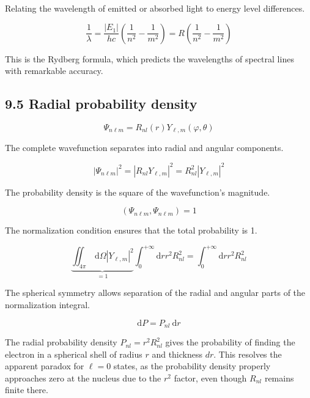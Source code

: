 \documentclass[italian]{HKNdocument}
\begin{document}
Relating the wavelength of emitted or absorbed light to energy level differences.

\begin{equation*}
\frac{1}{\lambda}=\frac{\left|E_{1}\right|}{h c}\left(\frac{1}{n^{2}}-\frac{1}{m^{2}}\right)=R\left(\frac{1}{n^{2}}-\frac{1}{m^{2}}\right) \tag{9.94}
\end{equation*}

This is the Rydberg formula, which predicts the wavelengths of spectral lines with remarkable accuracy.

\subsection*{9.5 Radial probability density}

\begin{equation*}
\Psi_{n \ell m}=R_{n l}(r) Y_{\ell, m}(\varphi, \theta) \tag{9.95}
\end{equation*}

The complete wavefunction separates into radial and angular components.

\begin{equation*}
\left|\Psi_{n \ell m}\right|^{2}=\left|R_{n l} Y_{\ell, m}\right|^{2}=R_{n l}^{2}\left|Y_{\ell, m}\right|^{2} \tag{9.96}
\end{equation*}

The probability density is the square of the wavefunction's magnitude.

\begin{equation*}
\left(\Psi_{n \ell m}, \Psi_{n \ell m}\right)=1 \tag{9.97}
\end{equation*}

The normalization condition ensures that the total probability is 1.

\begin{equation*}
\underbrace{\iint_{4 \pi} \mathrm{~d} \Omega\left|Y_{\ell, m}\right|^{2}}_{=1} \int_{0}^{+\infty} \mathrm{d} r r^{2} R_{n l}^{2}=\int_{0}^{+\infty} \mathrm{d} r r^{2} R_{n l}^{2} \tag{9.98}
\end{equation*}

The spherical symmetry allows separation of the radial and angular parts of the normalization integral.

\begin{equation*}
\mathrm{d} P=P_{n l} \mathrm{~d} r \tag{9.99}
\end{equation*}

The radial probability density $P_{nl} = r^2 R_{nl}^2$ gives the probability of finding the electron in a spherical shell of radius $r$ and thickness $dr$. This resolves the apparent paradox for $\ell=0$ states, as the probability density properly approaches zero at the nucleus due to the $r^2$ factor, even though $R_{nl}$ remains finite there.
\end{document}
